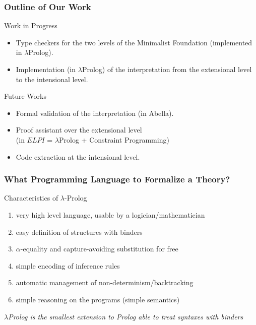 \documentclass{beamer}
\begin{document}
\begin{frame}
\frametitle{Outline of Our Work}
\begin{block}{Work in Progress}
	\begin{itemize}
	\item	Type checkers for the two levels of the Minimalist Foundation 
			(implemented in $\lambda$Prolog).
	\item 	Implementation (in $\lambda$Prolog) of the interpretation from 
			the extensional level to the intensional level.
	\end{itemize}
\end{block}
\begin{block}{Future Works}
	\begin{itemize}
                \item   Formal validation of the interpretation (in Abella).
		\item	Proof assistant over the extensional level\\
                 (in $ELPI$ = $\lambda$Prolog + Constraint Programming)
		\item 	Code extraction at the intensional level.
	\end{itemize}
\end{block}

	\note[item]{ }



\end{frame}



\begin{frame}[fragile]
\frametitle{What Programming Language to Formalize a Theory?}
\begin{block}{Characteristics of $\lambda$-Prolog}
	\begin{enumerate}
		\item very high level language, usable by a logician/mathematician
		\item easy definition of structures with binders
		\item $\alpha$-equality and capture-avoiding substitution for free
		\item simple encoding of inference rules
		\item automatic management of non-determinism/backtracking
		\item simple reasoning on the programs (simple semantics)
	\end{enumerate}
\end{block}
\begin{block}{}
\emph{$\lambda$Prolog is the smallest extension to Prolog able to treat syntaxes with binders}
\end{block} 
\end{frame}
\end{document}
